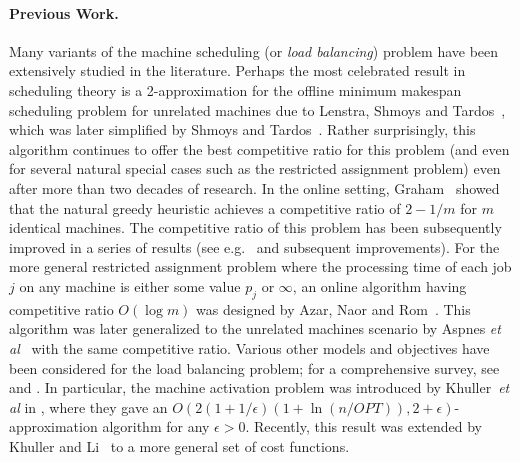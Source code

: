 \documentclass[11pt]{article}
\begin{document}
\paragraph{Previous Work.} 
Many variants of the machine scheduling (or {\em load balancing}) problem have been 
extensively studied in the literature. Perhaps the most celebrated result in 
scheduling theory is a 2-approximation for the offline minimum makespan scheduling problem
for unrelated machines due to Lenstra, Shmoys and Tardos~\cite{LenstraST90},
which was later simplified by Shmoys and Tardos~\cite{ShmoysT93}.
Rather surprisingly, this algorithm continues to offer the best competitive ratio for
this problem (and even for several natural special cases such as the restricted
assignment problem) even after more than two decades
of research. 
In the online setting, Graham~\cite{Graham66, Graham69} showed that the natural greedy
heuristic achieves
a competitive ratio of $2-1/m$ for $m$ identical machines. The competitive ratio of 
this problem has been subsequently improved in a series of results 
(see e.g.~\cite{BartalFKV95} and subsequent improvements). 
For the more general restricted assignment problem
where the processing time of each job $j$ on any machine is either some value $p_j$ 
or $\infty$, an online algorithm having competitive ratio $O(\log m)$ was designed
by Azar, Naor and Rom~\cite{AzarNR95}. This algorithm was later generalized to 
the unrelated machines scenario by Aspnes {\em et al}~\cite{AspnesAFPW97} 
with the same competitive ratio.
Various other models and objectives have been considered for the load balancing 
problem; for a comprehensive survey, see \cite{Azar96} and \cite{Sgall96}. 
In particular, the machine activation problem was introduced by 
Khuller~{\em et al} in \cite{KhullerLS10}, where they gave an 
$O(2(1+1/\epsilon)(1 + \ln (n/OPT)), 2+\epsilon)$-approximation algorithm for
any $\epsilon > 0$. Recently, this result was extended by Khuller and
Li~\cite{LiK11} to a more general set of cost functions.
\end{document}
